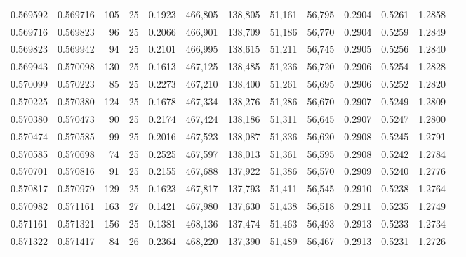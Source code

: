 \begin{tabular}{rrrrrrrrrrrrr}
0.569592 & 0.569716 &   105 &  25 &                                     0.1923 & 466,805 & 138,805 &  51,161 &  56,795 & 0.2904 & 0.5261 & 1.2858 \\
0.569716 & 0.569823 &    96 &  25 &                                     0.2066 & 466,901 & 138,709 &  51,186 &  56,770 & 0.2904 & 0.5259 & 1.2849 \\
0.569823 & 0.569942 &    94 &  25 &                                     0.2101 & 466,995 & 138,615 &  51,211 &  56,745 & 0.2905 & 0.5256 & 1.2840 \\
0.569943 & 0.570098 &   130 &  25 &                                     0.1613 & 467,125 & 138,485 &  51,236 &  56,720 & 0.2906 & 0.5254 & 1.2828 \\
0.570099 & 0.570223 &    85 &  25 &                                     0.2273 & 467,210 & 138,400 &  51,261 &  56,695 & 0.2906 & 0.5252 & 1.2820 \\
0.570225 & 0.570380 &   124 &  25 &                                     0.1678 & 467,334 & 138,276 &  51,286 &  56,670 & 0.2907 & 0.5249 & 1.2809 \\
0.570380 & 0.570473 &    90 &  25 &                                     0.2174 & 467,424 & 138,186 &  51,311 &  56,645 & 0.2907 & 0.5247 & 1.2800 \\
0.570474 & 0.570585 &    99 &  25 &                                     0.2016 & 467,523 & 138,087 &  51,336 &  56,620 & 0.2908 & 0.5245 & 1.2791 \\
0.570585 & 0.570698 &    74 &  25 &                                     0.2525 & 467,597 & 138,013 &  51,361 &  56,595 & 0.2908 & 0.5242 & 1.2784 \\
0.570701 & 0.570816 &    91 &  25 &                                     0.2155 & 467,688 & 137,922 &  51,386 &  56,570 & 0.2909 & 0.5240 & 1.2776 \\
0.570817 & 0.570979 &   129 &  25 &                                     0.1623 & 467,817 & 137,793 &  51,411 &  56,545 & 0.2910 & 0.5238 & 1.2764 \\
0.570982 & 0.571161 &   163 &  27 &                                     0.1421 & 467,980 & 137,630 &  51,438 &  56,518 & 0.2911 & 0.5235 & 1.2749 \\
0.571161 & 0.571321 &   156 &  25 &                                     0.1381 & 468,136 & 137,474 &  51,463 &  56,493 & 0.2913 & 0.5233 & 1.2734 \\
0.571322 & 0.571417 &    84 &  26 &                                     0.2364 & 468,220 & 137,390 &  51,489 &  56,467 & 0.2913 & 0.5231 & 1.2726 \\

\end{tabular}
